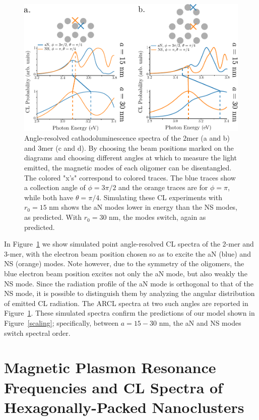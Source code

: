 \documentclass[journal=apchd5,manuscript=article]{achemso}
\begin{document}
\begin{figure}
\includegraphics{CL_incomplete.pdf}
\caption{Angle-resolved cathodoluminescence spectra of the 2mer (a and b) and 3mer (c and d). By choosing the beam positions marked on the diagrams and choosing different angles at which to measure the light emitted, the magnetic modes of each oligomer can be disentangled. The colored "x's" correspond to colored traces. The blue traces show a collection angle of $\phi = 3\pi/2$ and the orange traces are for $\phi = \pi$, while both have $\theta = \pi/4$. Simulating these CL experiments with $r_0 = 15$ nm shows the aN modes lower in energy than the NS modes, as predicted. With $r_0 = 30$ nm, the modes switch, again as predicted.}
\label{CL_2mer_3mer}
\end{figure}

In Figure~\ref{CL_2mer_3mer} we show simulated point angle-resolved CL spectra of the 2-mer and 3-mer, with the electron beam position chosen so as to excite the aN (blue) and NS (orange) modes. Note however, due to the symmetry of the oligomers, the blue electron beam position excites not only the aN mode, but also weakly the NS mode. Since the radiation profile of the aN mode is orthogonal to that of the NS mode, it is possible to distinguish them by analyzing the angular distribution of emitted CL radiation. The ARCL spectra at two such angles are reported in Figure~\ref{CL_2mer_3mer}. These simulated spectra confirm the predictions of our model shown in Figure~\ref{scaling}; specifically, between $a = 15 - 30$ nm, the aN and NS modes switch spectral order.

\section{Magnetic Plasmon Resonance Frequencies and CL Spectra of Hexagonally-Packed Nanoclusters}
\end{document}
